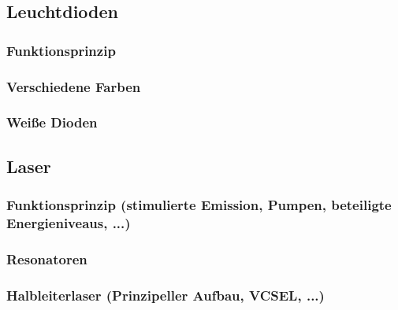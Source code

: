 \subsection{Leuchtdioden}
	\subsubsection{Funktionsprinzip}
	\subsubsection{Verschiedene Farben}
	\subsubsection{Weiße Dioden}
\subsection{Laser}
	\subsubsection{Funktionsprinzip (stimulierte Emission, Pumpen, beteiligte Energieniveaus, ...)}
	
	\subsubsection{Resonatoren}
	\subsubsection{Halbleiterlaser (Prinzipeller Aufbau, VCSEL, ...)}



